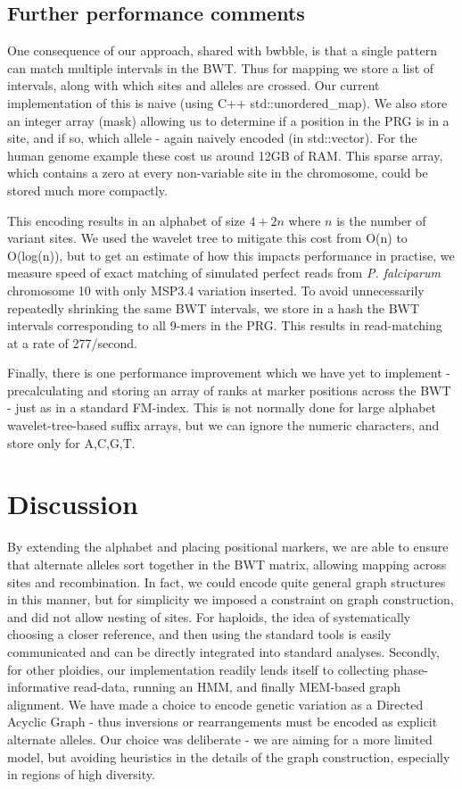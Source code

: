 \documentclass[runningheads,a4paper]{llncs}
\begin{document}
\subsection{Further performance comments}
One  consequence of our approach, shared with bwbble, is that a single pattern can match multiple intervals in the BWT. Thus for mapping we store a list of intervals, along with which sites and alleles are crossed. Our current implementation of this is naive (using C++ std::unordered\_map). We also store an integer array (mask) allowing us to determine if a position in the PRG is in a site, and if so, which allele - again naively encoded (in std::vector). For the human genome example these cost us around 12GB of RAM. This sparse  array, which contains a zero at every non-variable site in the chromosome,  could be stored much more compactly.

This encoding results in an alphabet of size $4+2n$ where $n$ is the number of variant sites. We used the wavelet tree to mitigate this cost from O(n) to O(log(n)), but to get an estimate of how this impacts performance in practise, we measure speed of exact matching of simulated perfect reads from \textit{P. falciparum} chromosome 10 with only MSP3.4 variation inserted. To avoid unnecessarily repeatedly shrinking the same BWT intervals, we store  in a hash the  BWT intervals corresponding to all 9-mers in the PRG. This results in read-matching at a rate of 277/second.



Finally, there is one performance improvement which we have yet to implement - precalculating and storing an array of ranks at marker positions across the BWT - just as in a standard FM-index. This is not normally done for large alphabet wavelet-tree-based suffix arrays, but we can ignore the numeric characters, and store only for A,C,G,T. 

\section{Discussion}
By extending the alphabet and placing positional markers, we are able to ensure that alternate alleles sort together in the BWT matrix, allowing mapping across sites and recombination. In fact, we could encode quite general graph structures in this manner, but for simplicity we imposed a constraint on graph construction, and did not allow nesting of sites. For haploids, the idea of systematically choosing a closer reference, and then using the standard tools is easily communicated and can be directly integrated into standard analyses. Secondly, for other ploidies, our implementation readily lends itself to collecting phase-informative read-data, running an HMM, and finally MEM-based graph alignment. We have made a choice to encode genetic variation as a Directed Acyclic Graph - thus inversions or rearrangements must be encoded as explicit alternate alleles. Our choice was deliberate - we are aiming for a more limited model, but avoiding heuristics in the details of the graph construction, especially in regions of high diversity. 
\end{document}
